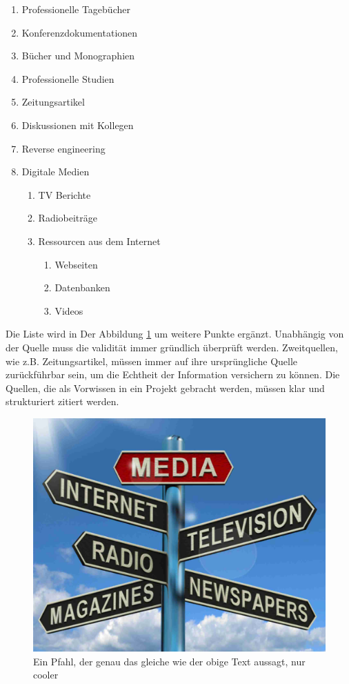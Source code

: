        \begin{enumerate}
            \item Professionelle Tagebücher
            \item Konferenzdokumentationen
            \item Bücher und Monographien
            \item Professionelle Studien 
            \item Zeitungsartikel
            \item Diskussionen mit Kollegen
            \item Reverse engineering
            \item Digitale Medien
                \begin{enumerate}
                    \item TV Berichte
                    \item Radiobeiträge
                    \item Ressourcen aus dem Internet
                        \begin{enumerate}
                            \item Webseiten
                            \item Datenbanken
                            \item Videos
                        \end{enumerate}
                \end{enumerate}
        \end{enumerate}
        

    Die Liste wird in Der Abbildung \ref{fig:medien} um weitere Punkte ergänzt.
    Unabhängig von der Quelle muss die validität immer gründlich überprüft werden. 
    Zweitquellen, wie z.B. Zeitungsartikel, müssen immer auf ihre ursprüngliche Quelle 
    zurückführbar sein, um die Echtheit der Information versichern zu können. Die Quellen, die 
    als Vorwissen in ein Projekt gebracht werden, müssen klar und strukturiert zitiert werden.

    \begin{figure}[H]
        \centering
        \includegraphics[width=0.5\linewidth]{graphics/media.jpg}
        \caption[Arten von Medien]{Ein Pfahl, der genau das gleiche wie der obige Text aussagt, nur cooler}

        
        \label{fig:medien}
    \end{figure}

